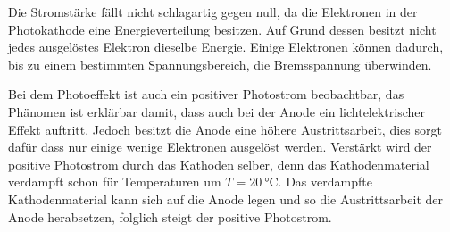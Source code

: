 Die Stromstärke fällt nicht schlagartig gegen null, da die Elektronen in der Photokathode
eine Energieverteilung besitzen. Auf Grund dessen besitzt nicht jedes ausgelöstes
Elektron dieselbe Energie. Einige Elektronen können dadurch, bis zu einem bestimmten Spannungsbereich,
die Bremsspannung überwinden.

Bei dem Photoeffekt ist auch ein positiver Photostrom beobachtbar, das
Phänomen ist erklärbar damit, dass auch bei der Anode ein lichtelektrischer Effekt
auftritt. Jedoch besitzt die Anode eine höhere Austrittsarbeit, dies sorgt
dafür dass nur einige wenige Elektronen ausgelöst werden.
Verstärkt wird der positive Photostrom durch das Kathoden selber,
denn das Kathodenmaterial verdampft schon für Temperaturen um
$T=\SI{20}{\celsius}$. Das verdampfte Kathodenmaterial kann sich auf die
Anode legen und so die Austrittsarbeit der Anode herabsetzen, folglich steigt der
positive Photostrom.
